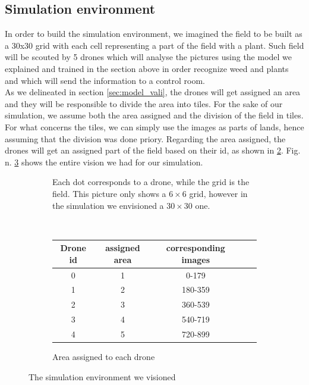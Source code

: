 \documentclass[english]{lni}
\begin{document}
\subsection{Simulation environment}\label{sec:simuEnvironment}
In order to build the simulation environment, we imagined the field to be built as a 30x30 grid with each cell representing a part of the field with a plant. Such field will be scouted by 5 drones which will analyse the pictures using the model we explained and trained in the section above in order recognize weed and plants and which will send the information to a control room.\\
As we delineated in section \ref{sec:model_vali}, the drones will get assigned an area and they will be responsible to divide the area into tiles. For the sake of our simulation, we assume both the area assigned and the division of the field in tiles. For what concerns the tiles, we can simply use the images as parts of lands, hence assuming that the division was done priory. Regarding the area assigned, the drones will get an assigned part of the field based on their id, as shown in \ref{tab:assigned_area}. Fig. n. \ref{fig:vision} shows the entire vision we had for our simulation. \\
\begin{figure}[ht]
\centering
\begin{subfigure}{.5\textwidth}
 \centering
{}
\caption{Each dot corresponds  to a drone, while the grid is the field. This picture only shows a $6\times6$ grid, however in the simulation we envisioned a $30\times30$ one. }
\label{fig:grid}
\end{subfigure}\\

\begin{subfigure}{.5\textwidth}
  \centering
\begin{tabular}{|c|c|c|c|c|}

\hline
    Drone id & assigned area & corresponding images\\
\hline
    0& 1 & 0-179\\
    1& 2 & 180-359\\
    2& 3 & 360-539\\
    3& 4 & 540-719\\
    4& 5 & 720-899\\
\hline
\end{tabular}
\caption{Area assigned to each drone}
\label{tab:assigned_area}
\end{subfigure}

\caption{The simulation environment we visioned}
\label{fig:vision}
\end{figure}\\
\end{document}
